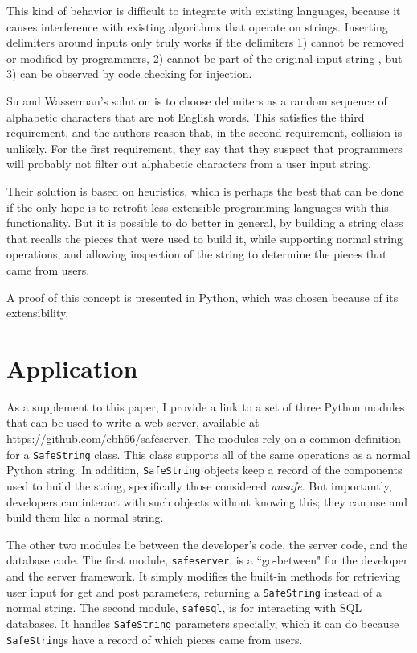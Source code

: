 \documentclass[twocolumn]{article}
\begin{document}
This kind of behavior is difficult to integrate with existing languages, because it causes interference with existing algorithms that operate on strings.  Inserting delimiters around inputs only truly works if the delimiters 1) cannot be removed or modified by programmers, 2) cannot be part of the original input string , but 3) can be observed by code checking for injection.

Su and Wasserman's solution is to choose delimiters as a random sequence of alphabetic characters that are not English words.  This satisfies the third requirement, and the authors reason that, in the second requirement, collision is unlikely.  For the first requirement, they say that they suspect that programmers will probably not filter out alphabetic characters from a user input string.\cite{su2006}

Their solution is based on heuristics, which is perhaps the best that can be done if the only hope is to retrofit less extensible programming languages with this functionality.   But it is possible to do better in general, by building a string class that recalls the pieces that were used to build it, while supporting normal string operations, and allowing inspection of the string to determine the pieces that came from users.

A proof of this concept is presented in Python, which was chosen because of its extensibility.


\section{Application}
As a supplement to this paper, I provide a link to a set of three Python modules that can be used to write a web server, available at \url{https://github.com/cbh66/safeserver}.  The modules rely on a common definition for a \verb;SafeString; class.  This class supports all of the same operations as a normal Python string.  In addition, \verb;SafeString; objects keep a record of the components used to build the string, specifically those considered \textit{unsafe}.  But importantly, developers can interact with such objects without knowing this; they can use and build them like a normal string.

The other two modules lie between the developer's code, the server code, and the database code.  The first module, \verb;safeserver;, is a ``go-between" for the developer and the server framework.  It simply modifies the built-in methods for retrieving user input for get and post parameters, returning a \verb;SafeString; instead of a normal string.  The second module, \verb;safesql;, is for interacting with SQL databases.  It handles \verb;SafeString; parameters specially, which it can do because \verb;SafeString;s have a record of which pieces came from users.
\end{document}
